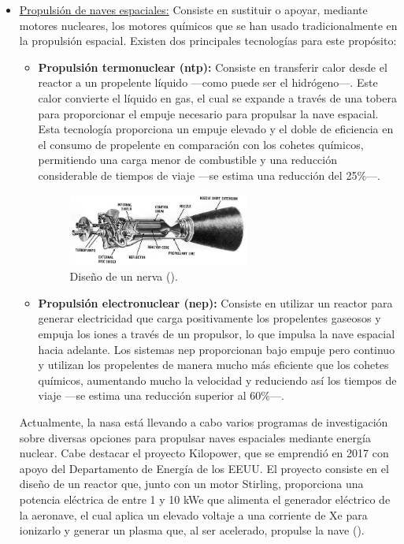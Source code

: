 \begin{itemize}
  \item \underline{Propulsión de naves espaciales:} Consiste en sustituir o apoyar, mediante motores nucleares, los motores químicos que se han usado tradicionalmente en la propulsión espacial. Existen dos principales tecnologías para este propósito:
  \begin{itemize}
    \item \textbf{Propulsión termonuclear (\acrshort{ntp}):} Consiste en transferir calor desde el reactor a un propelente líquido ---como puede ser el hidrógeno---. Este calor convierte el líquido en gas, el cual se expande a través de una tobera para proporcionar el empuje necesario para propulsar la nave espacial. Esta tecnología proporciona un empuje elevado y el doble de eficiencia en el consumo de propelente en comparación con los cohetes químicos, permitiendo una carga menor de combustible y una reducción considerable de tiempos de viaje ---se estima una reducción del 25\%---.
    
    \begin{figure}[h]
      \centering
      \includegraphics[width=0.6\textwidth]{content/figures/rover_nerva_engine.jpg}
      \caption{Diseño de un \acrfull{nerva} (\cite{nasa_space_nuclear_propulsion}).}
      \label{fig:nasa_space_nuclear_propulsion}
    \end{figure}

    \newpage
    \item \textbf{Propulsión electronuclear (\acrshort{nep}):} Consiste en utilizar un reactor para generar electricidad que carga positivamente los propelentes gaseosos y empuja los iones a través de un propulsor, lo que impulsa la nave espacial hacia adelante. Los sistemas \acrshort{nep} proporcionan bajo empuje pero continuo y utilizan los propelentes de manera mucho más eficiente que los cohetes químicos, aumentando mucho la velocidad y reduciendo así los tiempos de viaje ---se estima una reducción superior al 60\%---.
  \end{itemize}

  Actualmente, la \acrshort{nasa} está llevando a cabo varios programas de investigación sobre diversas opciones para propulsar naves espaciales mediante energía nuclear. Cabe destacar el proyecto Kilopower, que se emprendió en 2017 con apoyo del Departamento de Energía de los EEUU. El proyecto consiste en el diseño de un reactor  que, junto con un motor Stirling, proporciona una potencia eléctrica de entre 1 y 10 kWe que alimenta el generador eléctrico de la aeronave, el cual aplica un elevado voltaje a una corriente de Xe para ionizarlo y generar un plasma que, al ser acelerado, propulse la nave (\cite{nasa_space_nuclear_propulsion}).


\end{itemize}
